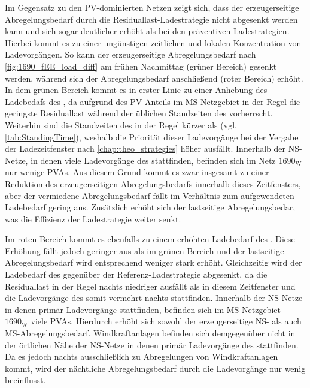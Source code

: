

Im Gegensatz zu den \gls{PV}-dominierten Netzen zeigt sich, dass der erzeugerseitige Abregelungsbedarf durch die Residuallast-Ladestrategie nicht abgesenkt werden kann und sich sogar deutlicher erhöht als bei den präventiven Ladestrategien.
Hierbei kommt es zu einer ungünstigen zeitlichen und lokalen Konzentration von Ladevorgängen.
So kann der erzeugerseitige Abregelungsbedarf nach \autoref{fig:1690_fEE_load_diff} am frühen Nachmittag (grüner Bereich) gesenkt werden, während sich der Abregelungsbedarf anschließend (roter Bereich) erhöht.
In dem grünen Bereich kommt es in erster Linie zu einer Anhebung des Ladebedafs des \UC \Firmeparkplatzdot, da aufgrund des \gls{PV}-Anteils im \gls{MS}-Netzgebiet in der Regel die geringste Residuallast während der üblichen Standzeiten des \UC \Firmeparkplatz vorherrscht.
Weiterhin sind die Standzeiten des \UC \Firmeparkplatz in der Regel kürzer als \zH (vgl. \autoref{tab:StandingTime}), weshalb die Priorität dieser Ladevorgänge bei der Vergabe der Ladezeitfenster nach \autoref{chap:theo_strategies} höher ausfällt.
Innerhalb der \gls{NS}-Netze, in denen viele Ladevorgänge des \UC \Firmeparkplatz stattfinden, befinden sich im Netz \(1690_{\text{W}}\) nur wenige \glspl{PVA}.
Aus diesem Grund kommt es zwar insgesamt zu einer Reduktion des erzeugerseitigen Abregelungsbedarfs innerhalb dieses Zeitfensters, aber der vermiedene Abregelungsbedarf fällt im Verhältnis zum aufgewendeten Ladebedarf gering aus.
Zusätzlich erhöht sich der lastseitige Abregelungsbedar, was die Effizienz der Ladestrategie weiter senkt.



Im roten Bereich kommt es ebenfalls zu einem erhöhten Ladebedarf des \UC \Firmeparkplatzdot.
Diese Erhöhung fällt jedoch geringer aus als im grünen Bereich und der lastseitige Abregelungsbedarf wird entsprechend weniger stark erhöht.
Gleichzeitig wird der Ladebedarf des \UC \zH gegenüber der Referenz-Ladestrategie abgesenkt, da die Residuallast in der Regel nachts niedriger ausfällt als in diesem Zeitfenster und die Ladevorgänge des \UC \zH somit vermehrt nachts stattfinden.
Innerhalb der \gls{NS}-Netze in denen primär Ladevorgänge \zH stattfinden, befinden sich im \gls{MS}-Netzgebiet \(1690_{\text{W}}\) viele \glspl{PVA}.
Hierdurch erhöht sich sowohl der erzeugerseitige \gls{NS}- als auch \gls{MS}-Abregelungsbedarf.
Windkraftanlagen befinden sich demgegenüber nicht in der örtlichen Nähe der \gls{NS}-Netze in denen primär Ladevorgänge des \UC \zH stattfinden.
Da es jedoch nachts ausschließlich zu Abregelungen von Windkraftanlagen kommt, wird der nächtliche Abregelungsbedarf durch die Ladevorgänge nur wenig beeinflusst.


